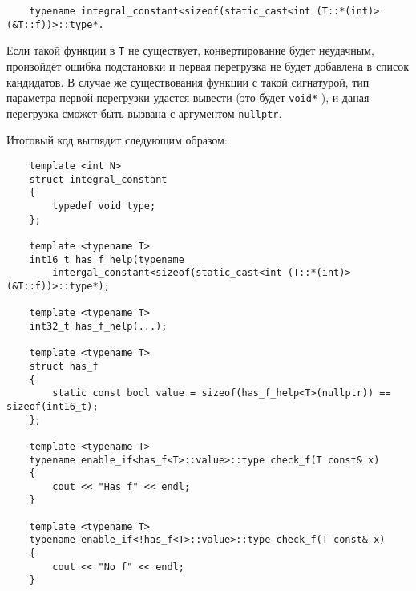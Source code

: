 	\begin{verbatim}
	typename integral_constant<sizeof(static_cast<int (T::*(int)>(&T::f))>::type*. 
	\end{verbatim}
	
	Если такой функции в \texttt{T} не существует, конвертирование будет неудачным, произойдёт ошибка подстановки и первая перегрузка не будет добавлена в список кандидатов. В случае же существования функции с такой сигнатурой, тип параметра первой перегрузки удастся вывести (это будет \texttt{void*} ), и даная перегрузка сможет быть вызвана с аргументом \texttt{nullptr}.
	
	Итоговый код выглядит следующим образом:
	
	\begin{verbatim}
	template <int N>
	struct integral_constant
	{
	    typedef void type;
	};

	template <typename T>
	int16_t has_f_help(typename 
	    intergal_constant<sizeof(static_cast<int (T::*(int)>(&T::f))>::type*);

	template <typename T>
	int32_t has_f_help(...);

	template <typename T>
	struct has_f
	{
	    static const bool value = sizeof(has_f_help<T>(nullptr)) == sizeof(int16_t);
	};

	template <typename T>
	typename enable_if<has_f<T>::value>::type check_f(T const& x)
	{
	    cout << "Has f" << endl;
	}

	template <typename T>
	typename enable_if<!has_f<T>::value>::type check_f(T const& x)
	{
	    cout << "No f" << endl;
	}
	\end{verbatim}
	

